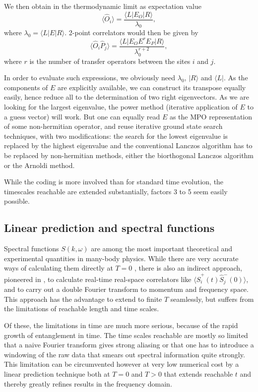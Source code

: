\documentclass[a4paper,10pt,oneside,onecolumn,1p,times]{elsarticle}
\newcommand{\bra}[1]{\mbox{$\langle #1  |$}}
\newcommand{\ket}[1]{\mbox{$| #1  \rangle$}}
\begin{document}
We then obtain in the thermodynamic limit as expectation value
\begin{equation}
\langle \hat{O}_i \rangle =  \frac{\bra{L} E_O \ket{R}}{\lambda_0} ,
\end{equation}
where $\lambda_0 = \bra{L} E \ket{R}$. 2-point correlators would then be given by
\begin{equation}
\langle \hat{O}_i \hat{P}_j \rangle =  \frac{\bra{L} E_O E^r E_P \ket{R}}{\lambda_0^{r+2}},
\end{equation}
where $r$ is the number of transfer operators between the sites $i$ and $j$. 

In order to evaluate such expressions, we obviously need $\lambda_0$, $\ket{R}$ and $\bra{L}$. As the components of $E$ are explicitly available, we can construct its transpose equally easily, hence reduce all to the determination of two right eigenvectors. As we are looking for the largest eigenvalue, the power method (iterative application of $E$ to a guess vector) will work. But one can equally read $E$ as the MPO representation of some non-hermitian operator, and reuse iterative ground state search techniques, with two modifications: the search for the lowest eigenvalue is replaced by the highest eigenvalue and the conventional Lanczos algorithm has to be replaced by non-hermitian methods, either the biorthogonal Lanczos algorithm or the Arnoldi method. 

While the coding is more involved than for standard time evolution, the timescales reachable are extended substantially, factors 3 to 5 seem easily possible.
  
\subsection{Linear prediction and spectral functions}
Spectral functions $S(k,\omega)$ are among the most important theoretical and experimental quantities in many-body physics. While there are very accurate ways of calculating them directly at $T=0$ \cite{Hallberg95,Ramasesha97,Kuhner99,Jeckelmann02}, there is also an indirect approach, pioneered in \cite{WhiteFeiguin04}, to calculate real-time real-space correlators like $\langle \hat{S}^+_i(t) \hat{S}^-_j(0) \rangle$, and to carry out a double Fourier transform to momentum and frequency space. This approach has the advantage to extend to finite $T$ seamlessly, but suffers from the limitations of reachable length and time scales.

Of these, the limitations in time are much more serious, because of the rapid growth of entanglement in time. The time scales reachable are mostly so limited that a naive Fourier transform gives strong aliasing or that one has to introduce a windowing of the raw data that smears out spectral information quite strongly.  This limitation can be circumvented however at very low numerical cost by a linear prediction technique both at $T=0$\cite{Pereira08,White08} and $T>0$\cite{Barthel09b} that extends reachable $t$ and thereby greatly refines results in the frequency domain.
\end{document}
